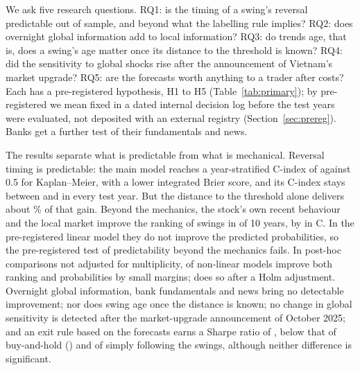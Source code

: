 We ask five research questions. RQ1: is the timing of a swing's reversal predictable out of
sample, and beyond what the labelling rule implies? RQ2: does overnight global information add to
local information? RQ3: do trends age, that is, does a swing's age matter once its distance to the
threshold is known? RQ4: did the sensitivity to global shocks rise after the announcement of
Vietnam's market upgrade? RQ5: are the forecasts worth anything to a trader after costs? Each has a
pre-registered hypothesis, H1 to H5 (Table~\ref{tab:primary}); by pre-registered we mean fixed in a
dated internal decision log before the test years were evaluated, not deposited with an external
registry (Section~\ref{sec:prereg}). Banks get a further test of
their fundamentals and news.

The results separate what is predictable from what is mechanical. Reversal timing is predictable:
the main model reaches a year-stratified C-index of \CABCDx{} against 0.5 for Kaplan--Meier, with a
lower integrated Brier score, and its C-index stays between \YearMinABCDx{} and \YearMaxABCDx{} in
every test year. But the distance to the threshold alone delivers about
\MechShareDIST\% of that gain. Beyond the mechanics, the stock's own recent behaviour and the local
market improve the ranking of swings in \YearsAboveABCxMFlex{} of 10 years, by \GainOverMFlex{} in C.
In the pre-registered linear model they do not improve the predicted probabilities, so the
pre-registered test of predictability beyond the mechanics fails. In post-hoc comparisons not
adjusted for multiplicity, \PHLikePass{} of \PHLikeCount{} non-linear models improve both ranking and
probabilities by small margins; \PHHolmPass{} does so after a Holm adjustment. Overnight global information,
bank fundamentals and news bring no detectable improvement; nor does swing age once the distance is
known; no change in global sensitivity is detected
after the market-upgrade announcement of October 2025; and an exit rule based on the forecasts
earns a Sharpe ratio of \BtOpenSharpeModel, below that of buy-and-hold (\BtOpenSharpeBh) and of
simply following the swings, although neither difference is significant.

